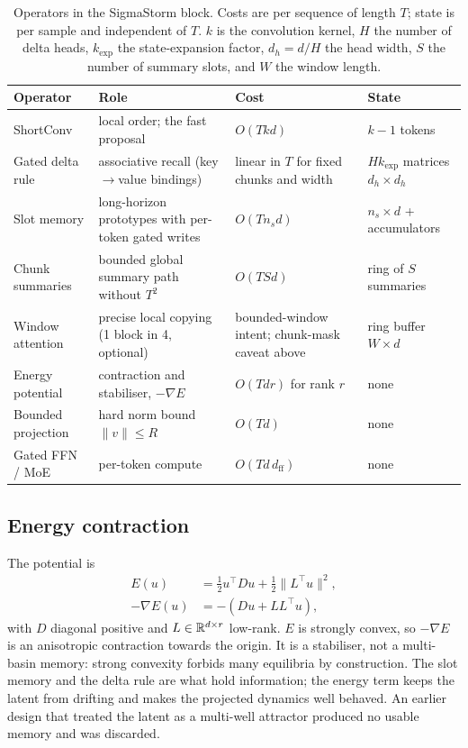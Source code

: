 \begin{table}[t]
\centering
\caption{Operators in the SigmaStorm block. Costs are per sequence of length $T$; state is
per sample and independent of $T$. $k$ is the convolution kernel, $H$ the number of delta
heads, $k_{\mathrm{exp}}$ the state-expansion factor, $d_h=d/H$ the head width, $S$ the number
of summary slots, and $W$ the window length.}
\label{tab:operators}
\small
\begin{tabularx}{\textwidth}{@{}l X l l@{}}
\toprule
Operator & Role & Cost & State \\
\midrule
ShortConv & local order; the fast proposal & $O(Tkd)$ & $k-1$ tokens \\
Gated delta rule & associative recall (key$\to$value bindings) & linear in $T$ for fixed chunks and width & $H k_{\mathrm{exp}}$ matrices $d_h\times d_h$ \\
Slot memory & long-horizon prototypes with per-token gated writes & $O(T n_s d)$ & $n_s\times d$ + accumulators \\
Chunk summaries & bounded global summary path without $T^2$ & $O(TSd)$ & ring of $S$ summaries \\
Window attention & precise local copying (1 block in 4, optional) & bounded-window intent; chunk-mask caveat above & ring buffer $W\times d$ \\
Energy potential & contraction and stabiliser, $-\nabla E$ & $O(Td r)$ for rank $r$ & none \\
Bounded projection & hard norm bound $\|v\|\leq R$ & $O(Td)$ & none \\
Gated FFN / MoE & per-token compute & $O(Td\,d_{\mathrm{ff}})$ & none \\
\bottomrule
\end{tabularx}
\end{table}

\subsection{Energy contraction}
\label{sec:method-energy}

The potential is
\begin{equation}
  \begin{aligned}
  E(u)&=\tfrac12 u^\top D u+\tfrac12\|L^\top u\|^2,\\
  -\nabla E(u)&=-(Du+LL^\top u),
  \end{aligned}
\end{equation}
with $D$ diagonal positive and $L\in\mathbb{R}^{d\times r}$ low-rank. $E$ is strongly convex, so
$-\nabla E$ is an anisotropic contraction towards the origin. It is a stabiliser, not a
multi-basin memory: strong convexity forbids many equilibria by construction. The slot memory
and the delta rule are what hold information; the energy term keeps the latent from drifting
and makes the projected dynamics well behaved. An earlier design that treated the latent as a
multi-well attractor produced no usable memory and was discarded.

